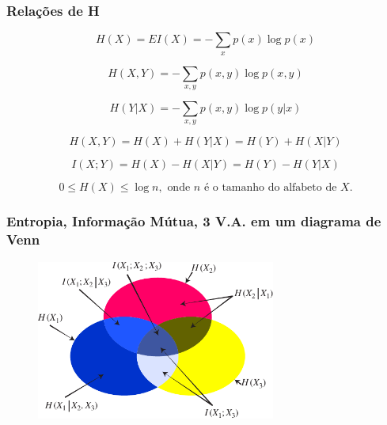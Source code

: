 \begin{frame}%
  \frametitle{Relações de H}

  \begin{equation}
  H(X) = E I(X) = - \sum_x p(x) \log p(x)
  \end{equation}

  \begin{equation}
  H(X,Y) = - \sum_{x,y} p(x,y) \log p(x,y)
  \end{equation}

  \begin{equation}
  H(Y|X) = - \sum_{x,y} p(x,y) \log p(y|x)
  \end{equation}

  \begin{equation}
  H(X,Y) = H(X) + H(Y|X) = H(Y) + H(X|Y)
  \end{equation}

  \begin{equation}
  I(X;Y) = H(X) - H(X|Y) = H(Y) - H(Y|X)
  \end{equation}

  \begin{equation}
  0 \leq H(X) \leq \log n, \text{ onde } n \text{ é o tamanho do alfabeto de } X.
  \end{equation}
\end{frame}

\begin{frame}%
  \frametitle{Entropia, Informação Mútua, 3 V.A. em um diagrama de Venn}
  \begin{figure}[h!]
  \centering
  \includegraphics[width=0.7\textwidth]{images/3va-venn.pdf}
  \label{fig:3va-venn}
  \end{figure}
\end{frame}


